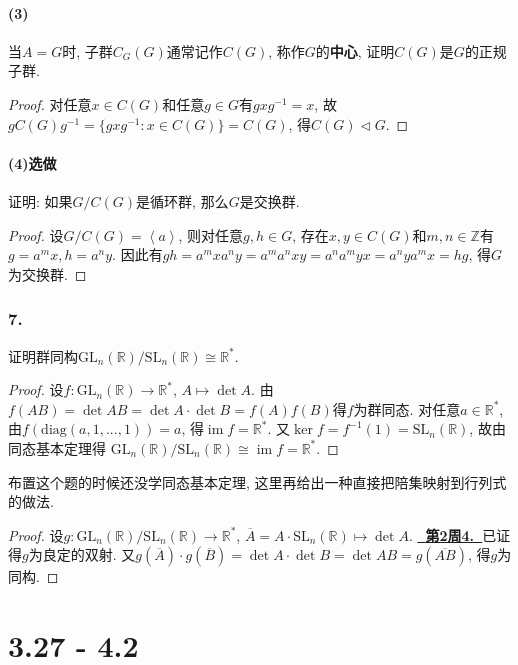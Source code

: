 \documentclass[12pt, a4paper, fontset=windows]{ctexart}
\newcommand{\R}{\mathbb{R}}
\newcommand{\Z}{\mathbb{Z}}
\newcommand{\GL}{\mathrm{GL}}
\newcommand{\SL}{\mathrm{SL}}
\newcommand{\cl}[1]{\overline{#1}} %
\newcommand{\gen}[1]{\left\langle{#1}\right\rangle}
\newcommand{\im}{\operatorname{im}}
\newcommand{\isom}{\cong} %
\newcommand{\myref}[2][]{\hyperref[#1]{\bf\color{blue}\ {#2}\ }}
\newcommand{\xuan}{{\normalsize 选做}}
\begin{document}
\subsection*{(3)}

当$A=G$时, 子群$C_G(G)$通常记作$C(G)$, 称作$G$的{\bf 中心}, 
证明$C(G)$是$G$的正规子群. 

\begin{proof}
对任意$x\in C(G)$和任意$g\in G$有$gxg^{-1}=x$, 
故$gC(G)g^{-1}=\{gxg^{-1}:x\in C(G)\}=C(G)$, 
得$C(G)\lhd G$. 
\end{proof}

\subsection*{(4)\xuan}

证明: 如果$G/C(G)$是循环群, 那么$G$是交换群. 

\begin{proof}
设$G/C(G)=\gen{a}$, 则对任意$g,h\in G$, 
存在$x,y\in C(G)$和$m,n\in\Z$有$g=a^mx,h=a^ny$. 
因此有$gh=a^mxa^ny=a^ma^nxy=a^na^myx=a^nya^mx=hg$, 
得$G$为交换群. 
\end{proof}

\section*{7.}

证明群同构$\GL_n(\R)/\SL_n(\R)\isom\R^*$. 

\begin{proof}
设$f:\GL_n(\R)\to\R^*$, $A\mapsto\det A$. 
由$f(AB)=\det AB=\det A\cdot\det B=f(A)f(B)$得$f$为群同态. 
对任意$a\in\R^*$, 由$f(\mathrm{diag}(a,1,...,1))=a$, 得$\im f=\R^*$. 
又$\ker f=f^{-1}(1)=\SL_n(\R)$, 故由同态基本定理得
$\GL_n(\R)/\SL_n(\R)\isom\im f=\R^*$. 
\end{proof}

布置这个题的时候还没学同态基本定理, 这里再给出一种直接把陪集映射到行列式的做法. 

\begin{proof}
设$g:\GL_n(\R)/\SL_n(\R)\to\R^*$, $\cl{A}=A\cdot\SL_n(\R)\mapsto\det A$. 
\myref[GL-SL]{第2周4.}已证得$g$为良定的双射. 又$g(\cl{A})\cdot g(\cl{B})=
\det A\cdot\det B=\det AB=g(\cl{AB})$, 得$g$为同构. 
\end{proof}

\clearpage
\part{3.27 - 4.2}
\end{document}
